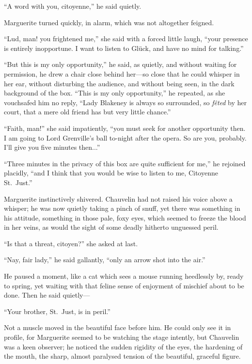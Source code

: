 \documentclass[paper=a5,BCOR=7mm,twoside,DIV=calc,12pt,usegeometry,chapterprefix,endperiod,headings=big]{scrbook}
\begin{document}
\enquote{A word with you, citoyenne,} he said quietly.

Marguerite turned quickly, in alarm, which was not altogether feigned.

\enquote{Lud, man! you frightened me,} she said with a forced little laugh, \enquote{your presence is entirely inopportune. I want to listen to Glück, and have no mind for talking.}

\enquote{But this is my only opportunity,} he said, as quietly, and without waiting for permission, he drew a chair close behind her---so close that he could whisper in her ear, without disturbing the audience, and without being seen, in the dark background of the box. \enquote{This is my only opportunity,} he repeated, as she vouchsafed him no reply, \enquote{Lady Blakeney is always so surrounded, so \textit{fêted} by her court, that a mere old friend has but very little chance.}

\enquote{Faith, man!} she said impatiently, \enquote{you must seek for another opportunity then. I am going to Lord Grenville's ball to-night after the opera. So are you, probably. I'll give you five minutes then...}

\enquote{Three minutes in the privacy of this box are quite sufficient for me,} he rejoined placidly, \enquote{and I think that you would be wise to listen to me, Citoyenne St.~Just.}

Marguerite instinctively shivered. Chauvelin had not raised his voice above a whisper; he was now quietly taking a pinch of snuff, yet there was something in his attitude, something in those pale, foxy eyes, which seemed to freeze the blood in her veins, as would the sight of some deadly hitherto unguessed peril.

\enquote{Is that a threat, citoyen?} she asked at last.

\enquote{Nay, fair lady,} he said gallantly, \enquote{only an arrow shot into the air.}

He paused a moment, like a cat which sees a mouse running heedlessly by, ready to spring, yet waiting with that feline sense of enjoyment of mischief about to be done. Then he said quietly---

\enquote{Your brother, St.~Just, is in peril.}

Not a muscle moved in the beautiful face before him. He could only see it in profile, for Marguerite seemed to be watching the stage intently, but Chauvelin was a keen observer; he noticed the sudden rigidity of the eyes, the hardening of the mouth, the sharp, almost paralysed tension of the beautiful, graceful figure.
\end{document}
